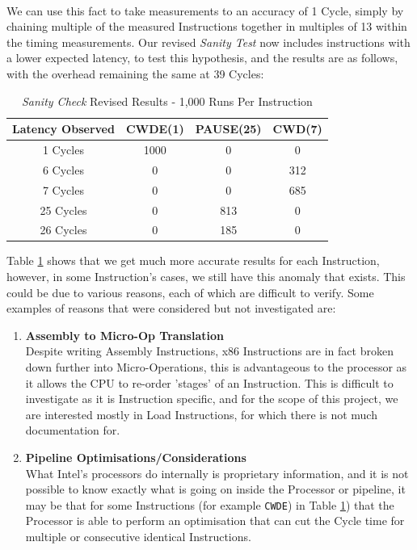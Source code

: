 \documentclass[bsc,frontabs,twoside,singlespacing,parskip,deptreport]{infthesis}     %
\begin{document}
\\
We can use this fact to take measurements to an accuracy of 1 Cycle, simply by chaining multiple of the measured Instructions together in multiples of 13 within the timing measurements. Our revised \textit{Sanity Test} now includes instructions with a lower expected latency, to test this hypothesis, and the results are as follows, with the overhead remaining the same at 39 Cycles:

\begin{table}[!h]
\begin{center}
\caption{\textit{Sanity Check} Revised Results - 1,000 Runs Per Instruction}
\label{fig:sanity-results-2}
\begin{tabular}{ |c||c|c|c| } 
    \hline
    Latency Observed & CWDE(1) & PAUSE(25) & CWD(7) \\
    \hline
    1 Cycles   & 1000 & 0   & 0   \\
    6 Cycles   & 0    & 0   & 312 \\
    7 Cycles   & 0    & 0   & 685 \\
    25 Cycles  & 0    & 813 & 0 \\
    26 Cycles  & 0    & 185 & 0   \\
    \hline
\end{tabular}
\end{center}
\end{table}

Table \ref{fig:sanity-results-2} shows that we get much more accurate results for each Instruction, however, in some Instruction's cases, we still have this anomaly that exists. This could be due to various reasons, each of which are difficult to verify. Some examples of reasons that were considered but not investigated are:

\begin{enumerate}
    \item{{\bf Assembly to Micro-Op Translation} \\
        Despite writing Assembly Instructions, x86 Instructions are in fact broken down further into Micro-Operations, this is advantageous to the processor as it allows the CPU to re-order 'stages' of an Instruction. This is difficult to investigate as it is Instruction specific, and for the scope of this project, we are interested mostly in Load Instructions, for which there is not much documentation for.
    }
    \item{{\bf Pipeline Optimisations/Considerations} \\
        What Intel's processors do internally is proprietary information, and it is not possible to know exactly what is going on inside the Processor or pipeline, it may be that for some Instructions (for example \texttt{CWDE}) in Table \ref{fig:sanity-results-2}) that the Processor is able to perform an optimisation that can cut the Cycle time for multiple or consecutive identical Instructions.
    }
\end{enumerate}
\end{document}

